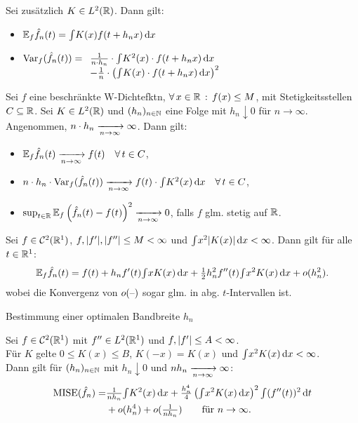 \documentclass{cheat-sheet}
\newcommand{\E}{\mathbb{E}} %
\newcommand{\Cont}{\mathcal{C}} %
\DeclareMathOperator{\MISE}{MISE} %
\DeclareMathOperator{\var}{Var} %
\begin{document}
\begin{lem}
  Sei zusätzlich $K \in L^2(\mathbb{R})$.
  Dann gilt:
  \begin{itemize}
    \item $\E_f \hat{f}_n(t) = \IInt{K(x) f(t + h_n x)}{x}$
    \item
    $\var_f (\hat{f}_n(t)) = 
    \begin{array}[t]{l}
      \tfrac{1}{n \cdot h_n} \cdot \IInt{K^2(x) \cdot f(t + h_n x)}{x} \\
      - \tfrac{1}{n} \cdot \left( \IInt{K(x) \cdot f(t + h_n x)}{x} \right)^2
    \end{array}$
  \end{itemize}
\end{lem}

\begin{satz}
  Sei $f$ eine beschränkte W-Dichtefktn, $\forall \, {x \in \mathbb{R}} \,:\, f(x) \leq M$, mit Stetigkeitsstellen $C \subseteq \mathbb{R}$.
  Sei $K \in L^2(\mathbb{R})$ und $(h_n)_{n \in \mathbb{N}}$ eine Folge mit $h_n \downarrow 0$ für $n \to \infty$.
  Angenommen, $n \cdot h_n \xrightarrow[n \to \infty]{} \infty$.
  Dann gilt:
  \begin{itemize}
    \item $\E_f \hat{f}_n(t) \xra[n \to \infty]{} f(t) \quad \forall \, t \in C$,
    \item $n \cdot h_n \cdot \var_f (\hat{f}_n(t)) \xra[n \to \infty]{} f(t) \cdot \IInt{K^2(x)}{x} \quad \forall \, t \in C$,
    \item $\sup_{t \in \R} \E_f \left( \hat{f}_n(t) - f(t) \right)^2 \xra[n \to \infty]{} 0$, falls $f$ glm. stetig auf $\mathbb{R}$.
  \end{itemize}
\end{satz}

\begin{satz}
  Sei $f \in \Cont^2(\R^1)$, $f, \lvert f'\rvert, \lvert f''\rvert \leq M < \infty$ und ${\textstyle \int} x^2 \lvert K(x)\rvert \,\mathrm{d} x < \infty$.
  Dann gilt für alle $t \in \mathbb{R}^1$:
  \[
    \E_f \hat{f}_n(t) = f(t) + h_n f'(t) \IInt{x K(x)}{x} + \tfrac{1}{2} h_n^2 f''(t) \IInt{x^2 K(x)}{x} + o(h_n^2).
  \]
  wobei die Konvergenz von $o(\text{--})$ sogar glm. in abg. $t$-Intervallen ist.
\end{satz}

\begin{ziel}
  Bestimmung einer optimalen Bandbreite $h_n$
\end{ziel}

\begin{satz}
  Sei $f \in \Cont^2(\R^1)$ mit $f'' \in L^2(\mathbb{R}^1)$ und $f, \lvert f'\rvert \leq A < \infty$. \\
  Für $K$ gelte $0 \leq K(x) \leq B$, $K(-x) = K(x)$ und ${\textstyle \int} x^2 K(x) \,\mathrm{d} x < \infty$. \\
  Dann gilt für $(h_n)_{n \in \mathbb{N}}$ mit $h_n \downarrow 0$ und $n h_n \xrightarrow[n \to \infty]{} \infty$:
  \begin{align*}
    \MISE(\hat{f}_n) = & \tfrac{1}{n h_n} \IInt{K^2(x)}{x} + \tfrac{h_n^4}{4} \left( \IInt{x^2 K(x)}{x} \right)^2 \IInt{(f''(t))^2}{t} \\
    & + o(h_n^4) + o(\tfrac{1}{n h_n}) \qquad
    \text{für } n \to \infty.
  \end{align*}
\end{satz}
\end{document}
